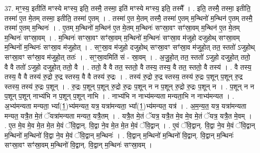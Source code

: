 \documentclass[17pt]{extarticle}
\begin{document}
37. मꣳ॒॒स्य॒ इतीति॑ मꣳस्ये मꣳस्य॒ इति॒ तस्मै॒ तस्मा॒ इति॑ मꣳस्ये मꣳस्य॒ इति॒ तस्मै᳚ । . इति॒ तस्मै॒ तस्मा॒ इतीति॒ तस्मा॑ ए॒त मे॒तम् तस्मा॒ इतीति॒ तस्मा॑ ए॒तम् । . तस्मा॑ ए॒त मे॒तम् तस्मै॒ तस्मा॑ ए॒तम् म॒न्थिनो॑ म॒न्थिन॑ ए॒तम् तस्मै॒ तस्मा॑ ए॒तम् म॒न्थिनः॑ । . ए॒तम् म॒न्थिनो॑ म॒न्थिन॑ ए॒त मे॒तम् म॒न्थिनः॑ सꣳस्रा॒वꣳ सꣳ॑स्रा॒वम् म॒न्थिन॑ ए॒त मे॒तम् म॒न्थिनः॑ सꣳस्रा॒वम् । . म॒न्थिनः॑ सꣳस्रा॒वꣳ सꣳ॑स्रा॒वम् म॒न्थिनो॑ म॒न्थिनः॑ सꣳस्रा॒व म॑जुहो दजुहोथ् सꣳस्रा॒वम् म॒न्थिनो॑ म॒न्थिनः॑ सꣳस्रा॒व म॑जुहोत् । . सꣳ॒॒स्रा॒व म॑जुहो दजुहोथ् सꣳस्रा॒वꣳ सꣳ॑स्रा॒व म॑जुहो॒त् तत॒ स्ततो॑ ऽजुहोथ् सꣳस्रा॒वꣳ सꣳ॑स्रा॒व म॑जुहो॒त् ततः॑ । . सꣳ॒॒स्रा॒वमिति॑ सं - स्रा॒वम् । . अ॒जु॒हो॒त् तत॒ स्ततो॑ ऽजुहो दजुहो॒त् ततो॒ वै वै ततो॑ ऽजुहो दजुहो॒त् ततो॒ वै । . ततो॒ वै वै तत॒ स्ततो॒ वै तस्य॒ तस्य॒ वै तत॒ स्ततो॒ वै तस्य॑ । . वै तस्य॒ तस्य॒ वै वै तस्य॑ रु॒द्रो रु॒द्र स्तस्य॒ वै वै तस्य॑ रु॒द्रः । . तस्य॑ रु॒द्रो रु॒द्र स्तस्य॒ तस्य॑ रु॒द्रः प॒शून् प॒शून् रु॒द्र स्तस्य॒ तस्य॑ रु॒द्रः प॒शून् । . रु॒द्रः प॒शून् प॒शून् रु॒द्रो रु॒द्रः प॒शून् न न प॒शून् रु॒द्रो रु॒द्रः प॒शून् न । . प॒शून् न न प॒शून् प॒शून् नाभ्य॑भि न प॒शून् प॒शून् नाभि । . नाभ्य॑भि न नाभ्य॑मन्यता मन्यता॒भि न नाभ्य॑मन्यत । . अ॒भ्य॑मन्यता मन्यता॒ भ्या᳚(1॒)भ्य॑मन्यत॒ यत्र॒ यत्रा॑मन्यता॒ भ्या᳚(1॒)भ्य॑मन्यत॒ यत्र॑ । . अ॒म॒न्य॒त॒ यत्र॒ यत्रा॑मन्यता मन्यत॒ यत्रै॒त मे॒तं ॅयत्रा॑मन्यता मन्यत॒ यत्रै॒तम् । . यत्रै॒त मे॒तं ॅयत्र॒ यत्रै॒त मे॒व मे॒व मे॒तं ॅयत्र॒ यत्रै॒त मे॒वम् । . ए॒त मे॒व मे॒व मे॒त मे॒त मे॒वं ॅवि॒द्वान्. वि॒द्वा ने॒व मे॒त मे॒त मे॒वं ॅवि॒द्वान् । . ए॒वं ॅवि॒द्वान्. वि॒द्वा ने॒व मे॒वं ॅवि॒द्वान् म॒न्थिनो॑ म॒न्थिनो॑ वि॒द्वा ने॒व मे॒वं ॅवि॒द्वान् म॒न्थिनः॑ । . वि॒द्वान् म॒न्थिनो॑ म॒न्थिनो॑ वि॒द्वान्. वि॒द्वान् म॒न्थिनः॑ सꣳस्रा॒वꣳ सꣳ॑स्रा॒वम् म॒न्थिनो॑ वि॒द्वान्. वि॒द्वान् म॒न्थिनः॑ सꣳस्रा॒वम् । \newline
\end{document}
